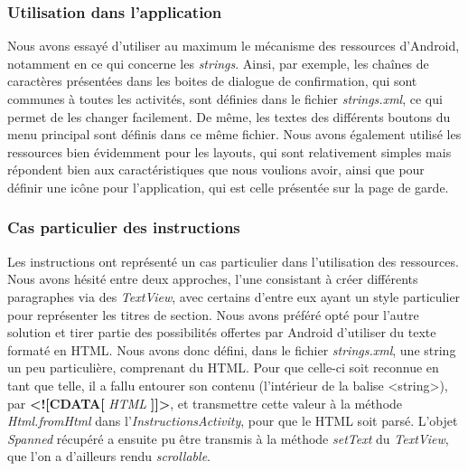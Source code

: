 \documentclass[12pt, a4paper]{article}%
\begin{document}
    \subsubsection{Utilisation dans l'application}
    Nous avons essayé d'utiliser au maximum le mécanisme des ressources d'Android, notamment en ce qui concerne les \textit{strings}. Ainsi, par exemple, les chaînes de caractères présentées dans les boites de dialogue de confirmation, qui sont communes à toutes les activités, sont définies dans le fichier \textit{strings.xml}, ce qui permet de les changer facilement. De même, les textes des différents boutons du menu principal sont définis dans ce même fichier.
    Nous avons également utilisé les ressources bien évidemment pour les layouts, qui sont relativement simples mais répondent bien aux caractéristiques que nous voulions avoir, ainsi que pour définir une icône pour l'application, qui est celle présentée sur la page de garde.
     
     \subsubsection{Cas particulier des instructions}
     Les instructions ont représenté un cas particulier dans l'utilisation des ressources. Nous avons hésité entre deux approches, l'une consistant à créer différents paragraphes via des \textit{TextView}, avec certains d'entre eux ayant un style particulier pour représenter les titres de section. Nous avons préféré opté pour l'autre solution et tirer partie des possibilités offertes par Android d'utiliser du texte formaté en HTML. Nous avons donc défini, dans le fichier \textit{strings.xml}, une string un peu particulière, comprenant du HTML. Pour que celle-ci soit reconnue en tant que telle, il a fallu entourer son contenu (l'intérieur de la balise <string>), par \textbf{<![CDATA[} \textit{HTML} \textbf{]]>}, et transmettre cette valeur à la méthode \textit{Html.fromHtml} dans l'\textit{InstructionsActivity}, pour que le HTML soit parsé. L'objet \textit{Spanned} récupéré a ensuite pu être transmis à la méthode \textit{setText} du \textit{TextView}, que l'on a d'ailleurs rendu \textit{scrollable}.
      
\end{document}
